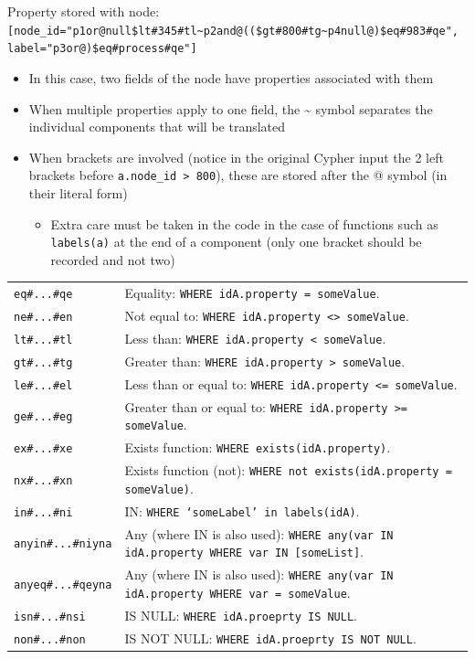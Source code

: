 \documentclass[letterpaper]{ltxdoc}
\begin{document}
Property stored with node:
\texttt{[node\_id="p1or@null\$lt\#345\#tl\textasciitilde p2and@((\$gt\#800\#tg\textasciitilde p4null@)\$eq\#983\#qe", label="p3or@)\$eq\#process\#qe"]}

\begin{itemize}
\item In this case, two fields of the node have properties associated with them
\item When multiple properties apply to one field, the \textasciitilde {} symbol separates the individual components that will be translated
\item When brackets are involved (notice in the original Cypher input the 2 left brackets before \texttt{a.node\_id > 800}), these are stored after the @ symbol (in their literal form)
\begin{itemize}
\item Extra care must be taken in the code in the case of functions such as \texttt{labels(a)} at the end of a component (only one bracket should be recorded and not two)
\end{itemize}
\end{itemize}

\begin{center}
\begin{tabular}{ p{2.5cm} p{11cm} }
\texttt{eq\#...\#qe} & Equality: \texttt{WHERE idA.property = someValue}. \\
\texttt{ne\#...\#en} & Not equal to: \texttt{WHERE idA.property <> someValue}. \\
\texttt{lt\#...\#tl} & Less than: \texttt{WHERE idA.property < someValue}. \\
\texttt{gt\#...\#tg} & Greater than: \texttt{WHERE idA.property > someValue}. \\
\texttt{le\#...\#el} & Less than or equal to: \texttt{WHERE idA.property <= someValue}. \\
\texttt{ge\#...\#eg} & Greater than or equal to: \texttt{WHERE idA.property >= someValue}. \\
\texttt{ex\#...\#xe} & Exists function: \texttt{WHERE exists(idA.property)}. \\
\texttt{nx\#...\#xn} & Exists function (not): \texttt{WHERE not exists(idA.property = someValue)}. \\
\texttt{in\#...\#ni} & IN: \texttt{WHERE `someLabel' in labels(idA)}. \\
\texttt{anyin\#...\#niyna} & Any (where IN is also used): \texttt{WHERE any(var IN idA.property WHERE var IN [someList]}. \\
\texttt{anyeq\#...\#qeyna} & Any (where IN is also used): \texttt{WHERE any(var IN idA.property WHERE var = someValue}. \\
\texttt{isn\#...\#nsi} & IS NULL: \texttt{WHERE idA.proeprty IS NULL}. \\
\texttt{non\#...\#non} & IS NOT NULL: \texttt{WHERE idA.proeprty IS NOT NULL}.
\end{tabular}
\end{center}
\end{document}
